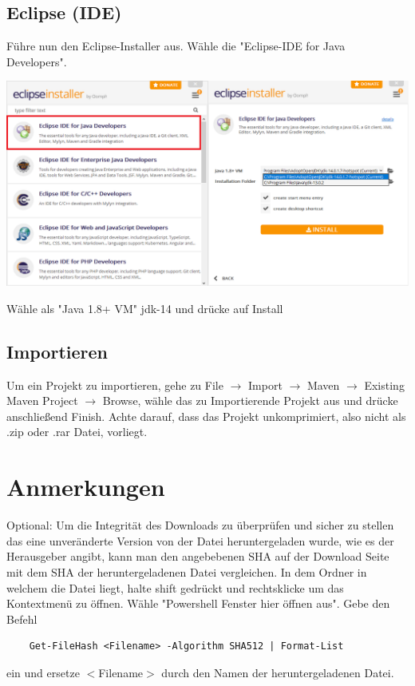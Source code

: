 \documentclass{scrartcl}
\begin{document}
\newpage
\subsection{Eclipse (IDE)}
Führe nun den Eclipse-Installer aus. Wähle die "Eclipse-IDE for Java Developers".\\
\begin{center}
    \includegraphics[width=\textwidth]{Screenshot_7.png}
\end{center}
Wähle als "Java 1.8+ VM" jdk-14 und drücke auf Install\\
\subsection{Importieren}
Um ein Projekt zu importieren, gehe zu File $\rightarrow$ Import $\rightarrow$ Maven  $\rightarrow$ Existing Maven Project  $\rightarrow$  Browse, wähle das zu Importierende Projekt aus und drücke anschließend Finish. Achte darauf, dass das Projekt unkomprimiert, also nicht als .zip oder .rar Datei, vorliegt.\\





\section{Anmerkungen}
Optional: Um die Integrität des Downloads zu überprüfen und sicher zu stellen das eine unveränderte Version von der Datei heruntergeladen wurde, wie es der Herausgeber angibt, kann man den angebebenen SHA auf der Download Seite mit dem SHA der heruntergeladenen Datei vergleichen. In dem Ordner in welchem die Datei liegt, halte shift gedrückt und rechtsklicke um das Kontextmenü zu öffnen. Wähle "Powershell Fenster hier öffnen aus". Gebe den Befehl 
    \begin{lstlisting}
    Get-FileHash <Filename> -Algorithm SHA512 | Format-List 
    \end{lstlisting}

ein und ersetze $<$Filename$>$ durch den Namen der heruntergeladenen Datei.
\end{document}
